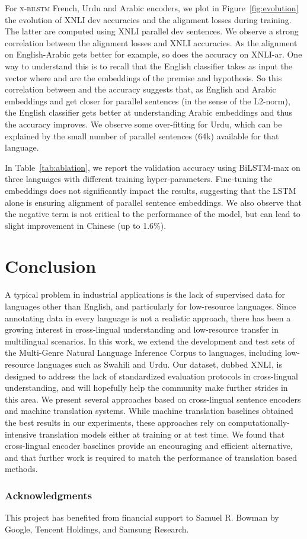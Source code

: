 \documentclass[11pt,a4paper]{article}
\begin{document}
For \textsc{x-bilstm} French, Urdu and Arabic encoders, we plot in Figure~\ref{fig:evolution} the evolution of XNLI dev accuracies and the alignment losses during training. The latter are computed using XNLI parallel dev sentences. We observe a strong correlation between the alignment losses and XNLI accuracies. As the alignment on English-Arabic gets better for example, so does the accuracy on XNLI-ar. One way to understand this is to recall that the English classifier takes as input the vector  where  and  are the embeddings of the premise and hypothesis. So this correlation between  and the accuracy suggests that, as English and Arabic embeddings  and  get closer for parallel sentences (in the sense of the L2-norm), the English classifier gets better at understanding Arabic embeddings  and thus the accuracy improves. We observe some over-fitting for Urdu, which can be explained by the small number of parallel sentences (64k) available for that language.

In Table~\ref{tab:ablation}, we report the validation accuracy using BiLSTM-max on three languages with different training hyper-parameters. Fine-tuning the embeddings does not significantly impact the results, suggesting that the LSTM alone is ensuring alignment of parallel sentence embeddings. We also observe that the negative term is not critical to the performance of the model, but can lead to slight improvement in Chinese (up to 1.6\%).

\section{Conclusion}
A typical problem in industrial applications is the lack of supervised data for languages other than English, and particularly for low-resource languages. Since annotating data in every language is not a realistic approach, there has been a growing interest in cross-lingual understanding and low-resource transfer in multilingual scenarios. In this work, we extend the development and test sets of the Multi-Genre Natural Language Inference Corpus to \nlangs languages, including low-resource languages such as Swahili and Urdu. Our dataset, dubbed XNLI, is designed to address the lack of standardized evaluation protocols in cross-lingual understanding, and will hopefully help the community make further strides in this area. We present several approaches based on cross-lingual sentence encoders and machine translation systems. While machine translation baselines obtained the best results in our experiments, these approaches rely on computationally-intensive translation models either at training or at test time. We found that cross-lingual encoder baselines provide an encouraging and efficient alternative, and that further work is required to match the performance of translation based methods.




\subsubsection*{Acknowledgments}

This project has benefited from financial support to Samuel R. Bowman by Google, Tencent Holdings, and Samsung Research.



\end{document}
